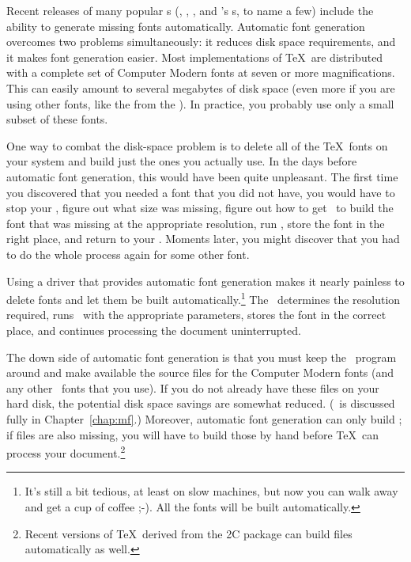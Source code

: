 Recent releases of many popular \dvidriver{}s (, 
, ,
and 's \dvidriver{}s, to name a few) include the ability
to generate missing fonts 
automatically.  
Automatic font generation overcomes two problems simultaneously: it
reduces disk space requirements, and it makes font generation easier.
Most implementations of \TeX\ are distributed with a complete set of
Computer Modern fonts at seven or more magnifications.  This can easily
amount to several megabytes of disk space (even more if you are using
other fonts, like the  from the 
).  In practice, you probably use only a small subset of these
fonts.

One way to combat the disk-space problem is to delete all of the \TeX\
fonts on your system and build just the ones you actually use.
In the days before automatic font generation, this would have
been quite unpleasant.  The first time you discovered that you needed
a font that you did not have, you would have to stop your \dvidriver,
figure out what size was missing, figure out how to get \MF\ to
build the font that was missing at the appropriate resolution,
run \MF, store the font in the right place, and return to your
\dvidriver.  Moments later, you might discover that you had to do
the whole process again for some other font.

Using a driver that provides automatic font generation makes it nearly
painless to delete fonts and let them be built automatically.\footnote{It's
still a bit tedious, at least on slow machines, but now you can walk away and
get a cup of coffee ;-).  All the fonts will be built automatically.}
The \dvidriver\ determines the resolution required, runs \MF\
with the appropriate parameters, stores the font in the correct
place, and continues processing the document uninterrupted.

The down side of automatic font generation is that you must keep
the \MF\ program around and make available the source files
for the Computer Modern fonts (and any other \MF\ fonts that you
use).  If you do not already have these files on your
hard disk, the potential disk space savings are  somewhat reduced.
(\MF\ is discussed fully in Chapter~\ref{chap:mf}.)
Moreover, automatic font generation
can only build ; if  files are also missing,
you will have to build those by hand before \TeX\ can process your
document.\footnote{Recent versions of \TeX\ derived from the 
\Web2C package can build \ext{TFM} files automatically as well.}

